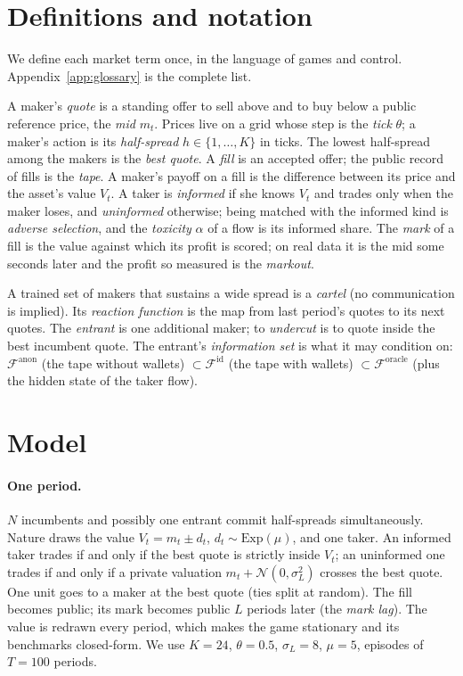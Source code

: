 \documentclass[11pt]{article}
\newcommand{\Fanon}{\mathcal{F}^{\mathrm{anon}}}
\newcommand{\Fid}{\mathcal{F}^{\mathrm{id}}}
\newcommand{\For}{\mathcal{F}^{\mathrm{oracle}}}
\begin{document}
\section{Definitions and notation}\label{sec:definitions}

We define each market term once, in the language of games and control. Appendix~\ref{app:glossary} is the complete list.

A maker's \emph{quote} is a standing offer to sell above and to buy below a public reference price, the \emph{mid} $m_t$. Prices live on a grid whose step is the \emph{tick} $\theta$; a maker's action is its \emph{half-spread} $h\in\{1,\dots,K\}$ in ticks. The lowest half-spread among the makers is the \emph{best quote}. A \emph{fill} is an accepted offer; the public record of fills is the \emph{tape}. A maker's payoff on a fill is the difference between its price and the asset's value $V_t$. A taker is \emph{informed} if she knows $V_t$ and trades only when the maker loses, and \emph{uninformed} otherwise; being matched with the informed kind is \emph{adverse selection}, and the \emph{toxicity} $\alpha$ of a flow is its informed share. The \emph{mark} of a fill is the value against which its profit is scored; on real data it is the mid some seconds later and the profit so measured is the \emph{markout}.

A trained set of makers that sustains a wide spread is a \emph{cartel} (no communication is implied). Its \emph{reaction function} is the map from last period's quotes to its next quotes. The \emph{entrant} is one additional maker; to \emph{undercut} is to quote inside the best incumbent quote. The entrant's \emph{information set} is what it may condition on: $\Fanon$ (the tape without wallets) $\subset\Fid$ (the tape with wallets) $\subset\For$ (plus the hidden state of the taker flow).

\section{Model}\label{sec:model}

\paragraph{One period.} $N$ incumbents and possibly one entrant commit half-spreads simultaneously. Nature draws the value $V_t=m_t\pm d_t$, $d_t\sim\mathrm{Exp}(\mu)$, and one taker. An informed taker trades if and only if the best quote is strictly inside $V_t$; an uninformed one trades if and only if a private valuation $m_t+\mathcal N(0,\sigma_L^2)$ crosses the best quote. One unit goes to a maker at the best quote (ties split at random). The fill becomes public; its mark becomes public $L$ periods later (the \emph{mark lag}). The value is redrawn every period, which makes the game stationary and its benchmarks closed-form. We use $K=24$, $\theta=0.5$, $\sigma_L=8$, $\mu=5$, episodes of $T=100$ periods.
\end{document}
